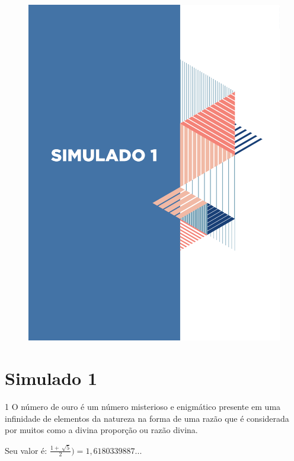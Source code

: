 


\mbox{}

\begin{figure}
\vspace*{-3cm}
\hspace*{-3.7cm}\includegraphics[scale=1]{../watermarks/1simulado9ano.pdf}
\end{figure}


\pagebreak

\section*{Simulado 1}

\num{1} O número de ouro é um número misterioso e enigmático presente em uma
infinidade de elementos da natureza na forma de uma razão que é
considerada por muitos como a divina proporção ou razão divina.

Seu valor é: $\frac{1 + \ \sqrt{5}}{2}) = 1,6180339887...$

